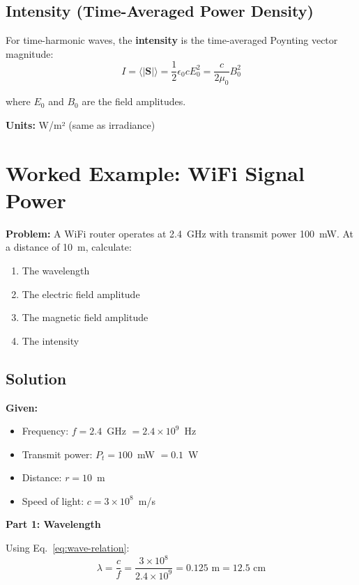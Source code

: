 \subsection{Intensity (Time-Averaged Power Density)}

For time-harmonic waves, the \textbf{intensity} is the time-averaged Poynting vector magnitude:
\begin{equation}
I = \langle |\mathbf{S}| \rangle = \frac{1}{2} \epsilon_0 c E_0^2 = \frac{c}{2\mu_0} B_0^2
\label{eq:intensity}
\end{equation}

where $E_0$ and $B_0$ are the field amplitudes.

\textbf{Units:} W/m² (same as irradiance)

\section{Worked Example: WiFi Signal Power}

\textbf{Problem:} A WiFi router operates at 2.4~GHz with transmit power 100~mW. At a distance of 10~m, calculate:
\begin{enumerate}
\item The wavelength
\item The electric field amplitude
\item The magnetic field amplitude
\item The intensity
\end{enumerate}

\subsection*{Solution}

\textbf{Given:}
\begin{itemize}
\item Frequency: $f = 2.4$~GHz $= 2.4 \times 10^9$~Hz
\item Transmit power: $P_t = 100$~mW $= 0.1$~W
\item Distance: $r = 10$~m
\item Speed of light: $c = 3 \times 10^8$~m/s
\end{itemize}

\textbf{Part 1: Wavelength}

Using Eq.~\ref{eq:wave-relation}:
\begin{equation}
\lambda = \frac{c}{f} = \frac{3 \times 10^8}{2.4 \times 10^9} = 0.125 \text{ m} = 12.5 \text{ cm}
\end{equation}

